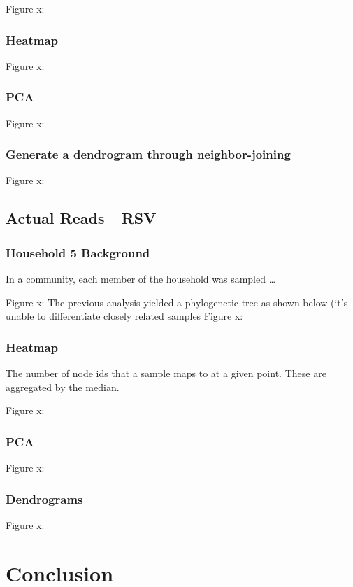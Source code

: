 \documentclass[10pt, a4paper]{article}
\begin{document}
Figure x:
\subsubsection{Heatmap}
\label{sec:orgfb494c1}

Figure x:
\subsubsection{PCA}
\label{sec:org9943e3c}

Figure x:
\subsubsection{Generate a dendrogram through neighbor-joining}
\label{sec:org33a0957}

Figure x:

\subsection{Actual Reads—RSV}
\label{sec:org96b82ee}
\subsubsection{Household 5 Background}
\label{sec:org93e26e0}
In a community, each member of the household was sampled …

Figure x:
The previous analysis yielded a phylogenetic tree as shown below (it’s unable to differentiate closely related samples
Figure x:

\subsubsection{Heatmap}
\label{sec:orgc79bfb9}
The number of node ids that a sample maps to at a given point. These are aggregated by the median.

Figure x:

\subsubsection{PCA}
\label{sec:org0389bc7}
Figure x:

\subsubsection{Dendrograms}
\label{sec:org5ba374e}
Figure x:
\section{Conclusion}
\label{sec:orgaf7a3a2}

\newpage


\end{document}
